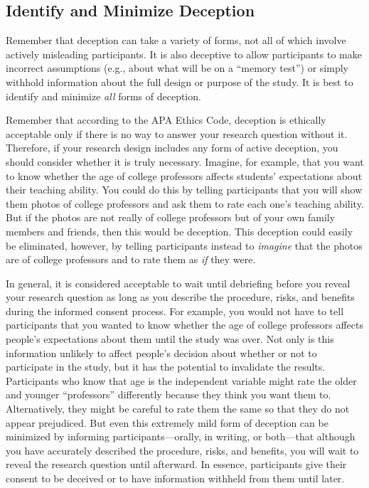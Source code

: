 \documentclass[
]{krantz}
\begin{document}
\hypertarget{identify-and-minimize-deception}{%
\subsection*{Identify and Minimize Deception}\label{identify-and-minimize-deception}}


Remember that deception can take a variety of forms, not all of which involve actively misleading participants. It is also deceptive to allow participants to make incorrect assumptions (e.g., about what will be on a ``memory test'') or simply withhold information about the full design or purpose of the study. It is best to identify and minimize \emph{all} forms of deception.

Remember that according to the APA Ethics Code, deception is ethically acceptable only if there is no way to answer your research question without it. Therefore, if your research design includes any form of active deception, you should consider whether it is truly necessary. Imagine, for example, that you want to know whether the age of college professors affects students' expectations about their teaching ability. You could do this by telling participants that you will show them photos of college professors and ask them to rate each one's teaching ability. But if the photos are not really of college professors but of your own family members and friends, then this would be deception. This deception could easily be eliminated, however, by telling participants instead to \emph{imagine} that the photos are of college professors and to rate them as \emph{if} they were.

In general, it is considered acceptable to wait until debriefing before you reveal your research question as long as you describe the procedure, risks, and benefits during the informed consent process. For example, you would not have to tell participants that you wanted to know whether the age of college professors affects people's expectations about them until the study was over. Not only is this information unlikely to affect people's decision about whether or not to participate in the study, but it has the potential to invalidate the results. Participants who know that age is the independent variable might rate the older and younger ``professors'' differently because they think you want them to. Alternatively, they might be careful to rate them the same so that they do not appear prejudiced. But even this extremely mild form of deception can be minimized by informing participants---orally, in writing, or both---that although you have accurately described the procedure, risks, and benefits, you will wait to reveal the research question until afterward. In essence, participants give their consent to be deceived or to have information withheld from them until later.
\end{document}

